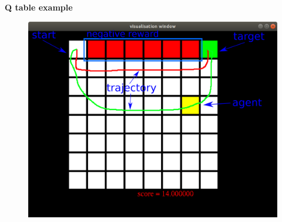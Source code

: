 \documentclass[xcolor=dvipsnames]{beamer}
\begin{document}
\begin{frame}{\bf Q table example}

\begin{figure}
  \includegraphics[scale=0.2]{../../diagrams/cliff_diagram.png}
\end{figure}


\end{frame}
\end{document}
